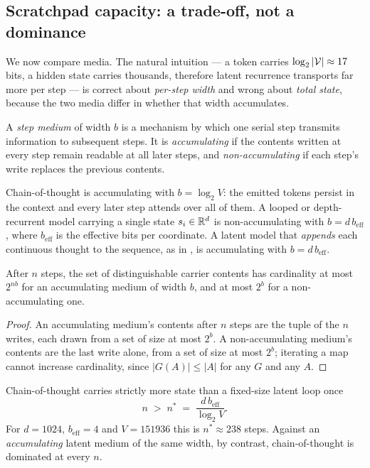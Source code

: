 \subsection{Scratchpad capacity: a trade-off, not a dominance}
\label{sec:time-capacity}

We now compare media. The natural intuition --- a token carries
$\log_2|\mathcal{V}| \approx 17$ bits, a hidden state carries thousands, therefore
latent recurrence transports far more per step --- is correct about
\emph{per-step width} and wrong about \emph{total state}, because the two media
differ in whether that width accumulates.

\begin{definition}
\label{def:medium}
A \emph{step medium} of width $b$ is a mechanism by which one serial step
transmits information to subsequent steps. It is \emph{accumulating} if the
contents written at every step remain readable at all later steps, and
\emph{non-accumulating} if each step's write replaces the previous contents.
\end{definition}

Chain-of-thought is accumulating with $b = \log_2 V$: the emitted tokens persist
in the context and every later step attends over all of them. A looped or
depth-recurrent model carrying a single state $s_i \in \mathbb{R}^{d}$ is
non-accumulating with $b = d\,b_{\mathrm{eff}}$, where $b_{\mathrm{eff}}$ is the
effective bits per coordinate. A latent model that \emph{appends} each
continuous thought to the sequence, as in \cite{hao2024coconut}, is accumulating
with $b = d\,b_{\mathrm{eff}}$.

\begin{theorem}
\label{thm:capacity}
After $n$ steps, the set of distinguishable carrier contents has cardinality at
most $2^{nb}$ for an accumulating medium of width $b$, and at most $2^{b}$ for a
non-accumulating one.
\end{theorem}

\begin{proof}
An accumulating medium's contents after $n$ steps are the tuple of the $n$
writes, each drawn from a set of size at most $2^{b}$. A non-accumulating
medium's contents are the last write alone, from a set of size at most $2^b$;
iterating a map cannot increase cardinality, since $|G(A)| \le |A|$ for any $G$
and any $A$.
\end{proof}

\begin{corollary}[Crossover]
\label{cor:crossover}
Chain-of-thought carries strictly more state than a fixed-size latent loop once
\begin{equation}
  n \;>\; n^{*} \;=\; \frac{d\,b_{\mathrm{eff}}}{\log_2 V} .
\end{equation}
For $d = 1024$, $b_{\mathrm{eff}} = 4$ and $V = 151936$ this is
$n^{*} \approx 238$ steps. Against an \emph{accumulating} latent medium of the
same width, by contrast, chain-of-thought is dominated at every $n$.
\end{corollary}

